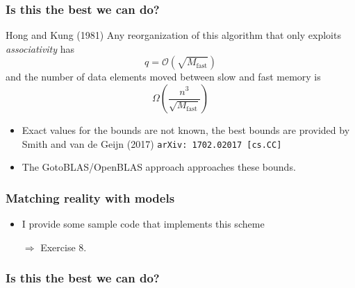 \documentclass[presentation,aspectratio=43,10pt]{beamer}
\begin{document}
\begin{frame}
  \frametitle{Is this the best we can do?}
  \begin{theorem}{Hong and Kung (1981)}
    Any reorganization of this algorithm that only exploits
    \emph{associativity} has
    \begin{equation*}
      q = \mathcal{O}(\sqrt{M_\text{fast}})
    \end{equation*}
    and the number of data elements moved between slow and fast memory
    is
    \begin{equation*}
      \Omega\left(\frac{n^3}{\sqrt{M_\text{fast}}}\right)
    \end{equation*}
  \end{theorem}

  \begin{itemize}
  \item Exact values for the bounds are not known, the best bounds are
    provided by Smith and van de Geijn (2017) \texttt{arXiv:
      1702.02017 [cs.CC]}
  \item The GotoBLAS/OpenBLAS approach approaches these bounds.
  \end{itemize}
\end{frame}

\begin{frame}
  \frametitle{Matching reality with models}
  \begin{itemize}
  \item I provide some sample code that implements this scheme
  \item[$\Rightarrow$] Exercise 8.
  \end{itemize}
\end{frame}


\begin{frame}
  \frametitle{Is this the best we can do?}
  \begin{center}
  \end{center}
\end{frame}
\end{document}
